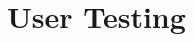 \documentclass[testing.tex]{subfiles}
\begin{document}
\section{User Testing} %
\label{sec:user_testing}

\end{document}
